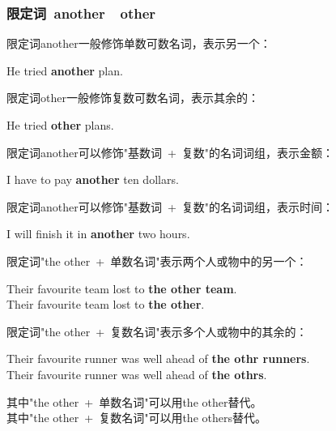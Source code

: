\documentclass[UTF8]{ctexart}
\newcommand{\littf}[1]{{\hspace{3pt}\ttfamily #1}}
\begin{document}
\subsubsection{限定词~\littf{another}~~\littf{other}}
    限定词\littf{another}一般修饰单数可数名词，表示另一个：
    \begin{center}
        \large\ttfamily
        He tried \textbf{another} plan.\\[6mm]
    \end{center}
    限定词\littf{\hphantom{\littf{x}}other\hphantom{\littf{x}}}一般修饰复数可数名词，表示其余的：
    \begin{center}
        \large\ttfamily
        He tried \textbf{other} plans.\\[6mm]
    \end{center}
    限定词\littf{another}可以修饰\littf{"\hspace{0pt}基数词~+~复数"}的名词词组，表示金额：
    \begin{center}
        \large\ttfamily
        I have to pay \textbf{another} ten dollars.\\[6mm]
    \end{center}
    限定词\littf{another}可以修饰\littf{"\hspace{0pt}基数词~+~复数"}的名词词组，表示时间：
    \begin{center}
        \large\ttfamily
        I will finish it in \textbf{another} two hours.\\[6mm]
    \end{center}
    限定词\littf{"the other~+~单数名词"}表示两个人或物中的另一个：
    \begin{center}
        \large\ttfamily
        Their favourite team lost to \textbf{the other team}.\\[3mm]
        Their favourite team lost to \textbf{the other}.\\[6mm]
    \end{center}
    限定词\littf{"the other~+~复数名词"}表示多个人或物中的其余的：
    \begin{center}
        \large\ttfamily
        Their favourite runner was well ahead of \textbf{the othr runners}.\\[3mm]
        Their favourite runner was well ahead of \textbf{the othrs}.\\[6mm]
    \end{center}
    其中\littf{"the other~+~单数名词"}可以用\littf{the other}替代。\\[3mm]
    其中\littf{"the other~+~复数名词"}可以用\littf{the others}替代。
\end{document}

